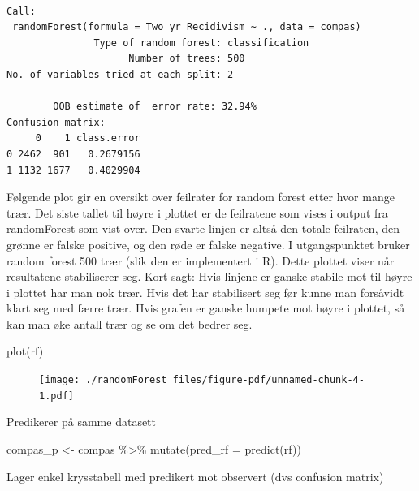 \documentclass[
  letterpaper,
  DIV=11,
  numbers=noendperiod]{scrreprt}
\newenvironment{Shaded}{\begin{snugshade}}{\end{snugshade}}
\newcommand{\AttributeTok}[1]{\textcolor[rgb]{0.40,0.45,0.13}{#1}}
\newcommand{\FunctionTok}[1]{\textcolor[rgb]{0.28,0.35,0.67}{#1}}
\newcommand{\NormalTok}[1]{\textcolor[rgb]{0.00,0.23,0.31}{#1}}
\newcommand{\OtherTok}[1]{\textcolor[rgb]{0.00,0.23,0.31}{#1}}
\newcommand{\SpecialCharTok}[1]{\textcolor[rgb]{0.37,0.37,0.37}{#1}}
\theoremstyle{definition}
\theoremstyle{remark}
\begin{document}
\begin{verbatim}

Call:
 randomForest(formula = Two_yr_Recidivism ~ ., data = compas) 
               Type of random forest: classification
                     Number of trees: 500
No. of variables tried at each split: 2

        OOB estimate of  error rate: 32.94%
Confusion matrix:
     0    1 class.error
0 2462  901   0.2679156
1 1132 1677   0.4029904
\end{verbatim}

Følgende plot gir en oversikt over feilrater for random forest etter
hvor mange trær. Det siste tallet til høyre i plottet er de feilratene
som vises i output fra randomForest som vist over. Den svarte linjen er
altså den totale feilraten, den grønne er falske positive, og den røde
er falske negative. I utgangspunktet bruker random forest 500 trær (slik
den er implementert i R). Dette plottet viser når resultatene
stabiliserer seg. Kort sagt: Hvis linjene er ganske stabile mot til
høyre i plottet har man nok trær. Hvis det har stabilisert seg før kunne
man forsåvidt klart seg med færre trær. Hvis grafen er ganske humpete
mot høyre i plottet, så kan man øke antall trær og se om det bedrer seg.

\begin{Shaded}
\begin{Highlighting}[]
\FunctionTok{plot}\NormalTok{(rf)}
\end{Highlighting}
\end{Shaded}

\begin{figure}[H]

{\centering \texttt{[image: ./randomForest\_files/figure-pdf/unnamed-chunk-4-1.pdf]}

}

\end{figure}

Predikerer på samme datasett

\begin{Shaded}
\begin{Highlighting}[]
\NormalTok{compas\_p }\OtherTok{\textless{}{-}}\NormalTok{ compas }\SpecialCharTok{\%\textgreater{}\%} 
  \FunctionTok{mutate}\NormalTok{(}\AttributeTok{pred\_rf =} \FunctionTok{predict}\NormalTok{(rf))}
\end{Highlighting}
\end{Shaded}

Lager enkel krysstabell med predikert mot observert (dvs confusion
matrix)
\end{document}
